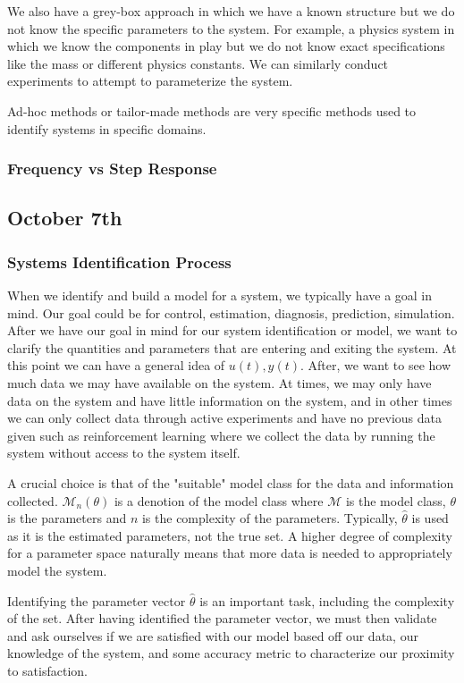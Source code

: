 \documentclass[11pt]{article}
\begin{document}
We also have a grey-box approach in which we have a known structure but we do not know the specific parameters to the system.
For example, a physics system in which we know the components in play but we do not know exact specifications like the mass or different physics constants.
We can similarly conduct experiments to attempt to parameterize the system.

Ad-hoc methods or tailor-made methods are very specific methods used to identify systems in specific domains.

\subsubsection{Frequency vs Step Response}

\subsection{October 7th}
\subsubsection{Systems Identification Process }
When we identify and build a model for a system, we typically have a goal in mind.
Our goal could be for control, estimation, diagnosis, prediction, simulation.
After we have our goal in mind for our system identification or model, we want to clarify the quantities and parameters that are entering and exiting the system.
At this point we can have a general idea of $u(t), y(t)$.
After, we want to see how much data we may have available on the system.
At times, we may only have data on the system and have little information on the system, and in other times we can only collect data through active experiments and have no previous data given such as reinforcement learning where we collect the data by running the system without access to the system itself.

A crucial choice is that of the "suitable" model class for the data and information collected.
$\mathcal{M}_n(\theta)$ is a denotion of the model class where $\mathcal{M}$ is the model class, $\theta$ is the parameters and $n$ is the complexity of the parameters. 
Typically, $\hat{\theta}$ is used as it is the estimated parameters, not the true set.
A higher degree of complexity for a parameter space naturally means that more data is needed to appropriately model the system.

Identifying the parameter vector $\hat{\theta}$ is an important task, including the complexity of the set.
After having identified the parameter vector, we must then validate and ask ourselves if we are satisfied with our model based off our data, our knowledge of the system, and some accuracy metric to characterize our proximity to satisfaction.
\end{document}
